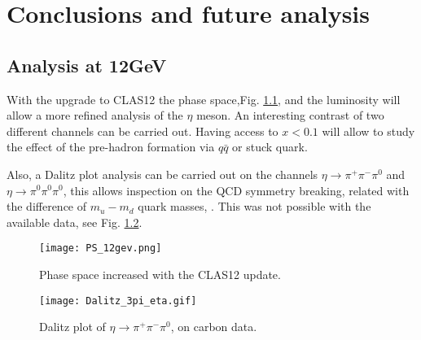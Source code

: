 \chapter{Conclusions and future analysis}
\section{Analysis at 12GeV}
With the upgrade to CLAS12 the phase space,Fig. \ref{fig:CLAS12_update}, and the luminosity will allow a more refined analysis of the $\eta$ meson. An interesting contrast of two different channels can be carried out.
Having access to $x<0.1$ will allow to study the effect of the pre-hadron formation via $q\bar{q}$ or stuck quark.

Also, a Dalitz plot analysis can be carried out on the channels $\eta \rightarrow \pi^+\pi^-\pi^0$ and $\eta \rightarrow \pi^0\pi^0\pi^0$, this allows inspection on the QCD symmetry breaking, related with the difference of $m_u-m_d$ quark masses, \cite{Kloe_eta}. This was not possible with the available data, see Fig.  \ref{fig:dalitz_carbon}.
%
\begin{figure}[H]
\centering
\texttt{[image: PS\_12gev.png]}
\caption{Phase space increased with the CLAS12 update.}
\label{fig:CLAS12_update}
\end{figure}
%
\begin{figure}[H]
\centering
\texttt{[image: Dalitz\_3pi\_eta.gif]}
\caption{Dalitz plot of $\eta \rightarrow \pi^+\pi^-\pi^0$, on carbon data.}
\label{fig:dalitz_carbon}
\end{figure}  